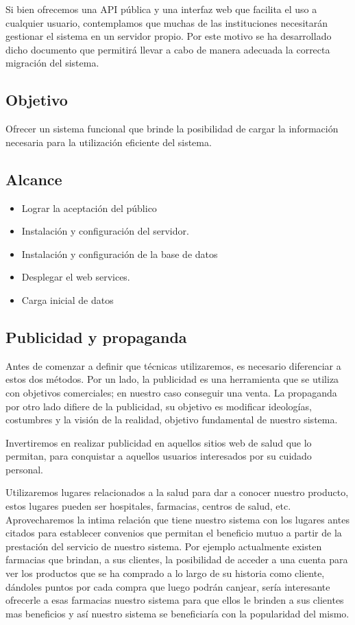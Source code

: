 \documentclass[a4paper,12pt]{article}
\begin{document}
Si bien ofrecemos una API pública y una interfaz web que facilita el uso a cualquier usuario, contemplamos que muchas de las instituciones necesitarán gestionar el sistema en un servidor propio. Por este motivo se ha desarrollado dicho documento que permitirá llevar a cabo de manera adecuada la correcta migración del sistema.

\subsection{Objetivo}


Ofrecer un sistema funcional que brinde la posibilidad de cargar la información necesaria para la utilización eficiente del sistema.
\subsection{Alcance}
\begin{itemize}
	\item Lograr la aceptación del público
	\item Instalación y configuración del servidor.
	\item Instalación y configuración de la base de datos
	\item Desplegar el web services.
	\item Carga inicial de datos
\end{itemize}

\subsection{Publicidad y propaganda}

Antes de comenzar a definir que técnicas utilizaremos, es necesario diferenciar a estos dos métodos. Por un lado, la publicidad es una herramienta que se utiliza con objetivos comerciales; en nuestro caso conseguir una venta. La propaganda por otro lado difiere de la publicidad, su objetivo es modificar ideologías, costumbres y la visión de la realidad, objetivo fundamental de nuestro sistema.

Invertiremos en realizar publicidad en aquellos sitios web de salud que lo permitan, para conquistar a aquellos usuarios interesados por su cuidado personal.

Utilizaremos lugares relacionados a la salud para dar a conocer nuestro producto, estos lugares pueden ser hospitales, farmacias, centros de salud, etc. Aprovecharemos la intima relación que tiene nuestro sistema con los lugares antes citados para establecer  convenios que permitan el beneficio mutuo  a partir de la prestación del servicio de nuestro sistema. 
Por ejemplo actualmente existen farmacias que brindan, a sus clientes, la posibilidad  de acceder a una cuenta para ver  los productos que se ha comprado a lo largo de su historia como cliente, dándoles puntos por cada compra que luego podrán canjear, sería interesante ofrecerle a esas farmacias nuestro sistema para que ellos le brinden a sus clientes mas beneficios y así nuestro sistema se beneficiaría con la popularidad del mismo.
\end{document}

